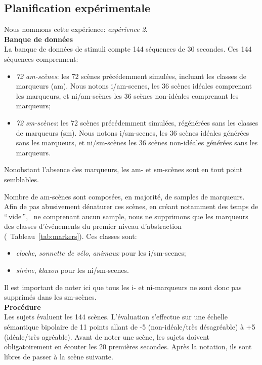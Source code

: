 \subsection{Planification expérimentale}

Nous nommons cette expérience: \emph{expérience 2}. \\

\textbf{Banque de données} \\

La banque de données de stimuli compte 144 séquences de 30 secondes. Ces 144 séquences comprennent:

\begin{itemize}
\item \emph{72 am-scènes}: les 72 scènes précédemment simulées, incluant les classes de marqueurs (am). Nous notons i/am-scenes, les 36 scènes idéales comprenant les marqueurs, et ni/am-scènes les 36 scènes non-idéales comprenant les marqueurs;
\item \emph{72 sm-scènes}: les 72 scènes précédemment simulées, régénérées sans les classes de marqueurs (sm). Nous notons i/sm-scenes, les 36 scènes idéales générées sans les marqueurs, et ni/sm-scènes les 36 scènes non-idéales générées sans les marqueurs.
\end{itemize}

Nonobstant l'absence des marqueurs, les am- et sm-scènes sont en tout point semblables. 

Nombre de am-scènes sont composées, en majorité, de samples de marqueurs. Afin de pas abusivement dénaturer ces scènes, en créant notamment des temps de ``\,vide\,'', \ie~ne comprenant aucun sample, nous ne supprimons que les marqueurs des classes d'événements du premier niveau d'abstraction (\cf~Tableau~\ref{tab:markers}). Ces classes sont: 

\begin{itemize}
\item \emph{cloche}, \emph{sonnette de vélo}, \emph{animaux} pour les i/sm-scenes;
\item \emph{sirène}, \emph{klaxon} pour les ni/sm-scenes.
\end{itemize}
 
Il est important de noter ici que tous les i- et ni-marqueurs ne sont donc pas supprimés dans les sm-scènes. \\
 
\textbf{Procédure} \\

Les sujets évaluent les 144 scènes. L'évaluation s'effectue sur une échelle sémantique bipolaire de 11 points allant de -5 (non-idéale/très désagréable) à +5 (idéale/très agréable). Avant de noter une scène, les sujets doivent obligatoirement en écouter les 20 premières secondes. Après la notation, ils sont libres de passer à la scène suivante.

